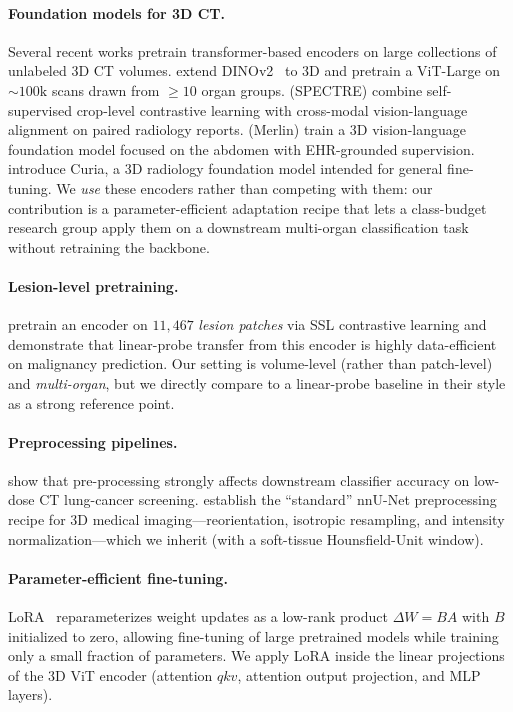\documentclass{article}
\begin{document}
\paragraph{Foundation models for 3D CT.}
Several recent works pretrain transformer-based encoders on large
collections of unlabeled 3D CT volumes.
\citet{xu2025_3dino} extend DINOv2~\citep{oquab2024_dinov2} to 3D and
pretrain a ViT-Large on $\sim$$100\text{k}$ scans drawn from $\geq 10$
organ groups.
\citet{claessens2025_spectre} (SPECTRE) combine self-supervised crop-level
contrastive learning with cross-modal vision-language alignment on
paired radiology reports.
\citet{blankemeier2026_merlin} (Merlin) train a 3D vision-language
foundation model focused on the abdomen with EHR-grounded supervision.
\citet{hayes2025_curia} introduce Curia, a 3D radiology foundation
model intended for general fine-tuning.
We \emph{use} these encoders rather than competing with them: our
contribution is a parameter-efficient adaptation recipe that lets a
class-budget research group apply them on a downstream multi-organ
classification task without retraining the backbone.

\paragraph{Lesion-level pretraining.}
\citet{pai2024_cancer_fm} pretrain an encoder on $11{,}467$ \emph{lesion
patches} via SSL contrastive learning and demonstrate that
linear-probe transfer from this encoder is highly data-efficient on
malignancy prediction. Our setting is volume-level (rather than
patch-level) and \emph{multi-organ}, but we directly compare to a
linear-probe baseline in their style as a strong reference point.

\paragraph{Preprocessing pipelines.}
\citet{thakral2025_lowdose} show that pre-processing strongly affects
downstream classifier accuracy on low-dose CT lung-cancer screening.
\citet{isensee2021_nnunet} establish the ``standard'' nnU-Net
preprocessing recipe for 3D medical imaging---reorientation,
isotropic resampling, and intensity normalization---which we
inherit (with a soft-tissue Hounsfield-Unit window).

\paragraph{Parameter-efficient fine-tuning.}
LoRA~\citep{hu2022_lora} reparameterizes weight updates as a low-rank
product $\Delta W = BA$ with $B$ initialized to zero, allowing fine-tuning
of large pretrained models while training only a small fraction of
parameters. We apply LoRA inside the linear projections of the 3D ViT
encoder (attention $qkv$, attention output projection, and MLP layers).
\end{document}
